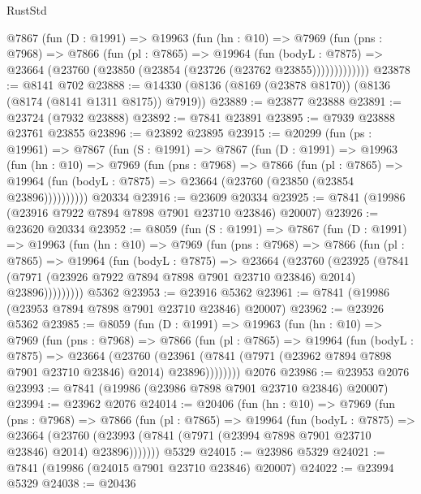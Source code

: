 \begin{lexlean}{RustStd}
\begin{coremodule}
        @7867
          (fun (D : @1991) =>
          @19963
            (fun (hn : @10) =>
            @7969
              (fun (pns : @7968) =>
              @7866
                (fun (pl : @7865) =>
                @19964
                  (fun (bodyL : @7875) =>
                  @23664 (@23760 (@23850 (@23854 (@23726 (@23762 @23855)))))))))))))
@23878 := @8141 @702
@23888 := @14330 (@8136 (@8169 (@23878 @8170)) (@8136 (@8174 (@8141 @1311 @8175)) @7919))
@23889 := @23877 @23888
@23891 := @23724 (@7932 @23888)
@23892 := @7841 @23891
@23895 := @7939 @23888 @23761 @23855
@23896 := @23892 @23895
@23915 := @20299
    (fun (ps : @19961) =>
    @7867
      (fun (S : @1991) =>
      @7867
        (fun (D : @1991) =>
        @19963
          (fun (hn : @10) =>
          @7969
            (fun (pns : @7968) =>
            @7866
              (fun (pl : @7865) =>
              @19964 (fun (bodyL : @7875) => @23664 (@23760 (@23850 (@23854 @23896))))))))))
    @20334
@23916 := @23609 @20334
@23925 := @7841 (@19986 (@23916 @7922 @7894 @7898 @7901 @23710 @23846) @20007)
@23926 := @23620 @20334
@23952 := @8059
    (fun (S : @1991) =>
    @7867
      (fun (D : @1991) =>
      @19963
        (fun (hn : @10) =>
        @7969
          (fun (pns : @7968) =>
          @7866
            (fun (pl : @7865) =>
            @19964
              (fun (bodyL : @7875) =>
              @23664
                (@23760
                  (@23925
                    (@7841
                      (@7971 (@23926 @7922 @7894 @7898 @7901 @23710 @23846) @2014)
                      @23896)))))))))
    @5362
@23953 := @23916 @5362
@23961 := @7841 (@19986 (@23953 @7894 @7898 @7901 @23710 @23846) @20007)
@23962 := @23926 @5362
@23985 := @8059
    (fun (D : @1991) =>
    @19963
      (fun (hn : @10) =>
      @7969
        (fun (pns : @7968) =>
        @7866
          (fun (pl : @7865) =>
          @19964
            (fun (bodyL : @7875) =>
            @23664
              (@23760
                (@23961 (@7841 (@7971 (@23962 @7894 @7898 @7901 @23710 @23846) @2014) @23896))))))))
    @2076
@23986 := @23953 @2076
@23993 := @7841 (@19986 (@23986 @7898 @7901 @23710 @23846) @20007)
@23994 := @23962 @2076
@24014 := @20406
    (fun (hn : @10) =>
    @7969
      (fun (pns : @7968) =>
      @7866
        (fun (pl : @7865) =>
        @19964
          (fun (bodyL : @7875) =>
          @23664
            (@23760 (@23993 (@7841 (@7971 (@23994 @7898 @7901 @23710 @23846) @2014) @23896)))))))
    @5329
@24015 := @23986 @5329
@24021 := @7841 (@19986 (@24015 @7901 @23710 @23846) @20007)
@24022 := @23994 @5329
@24038 := @20436

\end{coremodule}
\end{lexlean}
